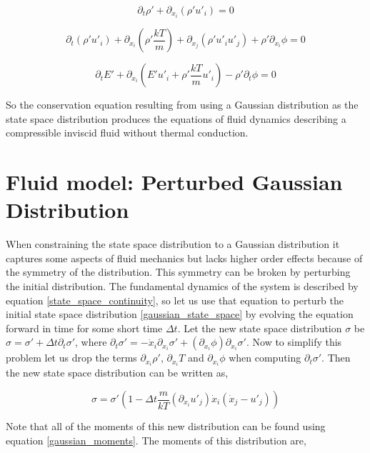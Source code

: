 \documentclass[%
 twocolumn,
 amsmath,amssymb,
 aps,
]{revtex4-1}
\begin{document}
\[
\partial_t \rho' + \partial_{x_i}\left(\rho'u'_i\right)=0
\]

\[
\partial_t \left(\rho' u'_i\right) + \partial_{x_i}\left(\rho'\frac{kT}{m}\right) + \partial_{x_j}\left(\rho'u'_iu'_j\right) + \rho'\partial_{x_i}\phi = 0
\]

\[
\partial_t E' + \partial_{x_i}\left(E'u'_i + \rho'\frac{kT}{m}u'_i\right)-\rho'\partial_t\phi = 0
\]

So the conservation equation resulting from using a Gaussian distribution as the state space distribution produces the equations of fluid dynamics describing a compressible inviscid fluid without thermal conduction.

\section{Fluid model: Perturbed Gaussian Distribution}
When constraining the state space distribution to a Gaussian distribution it captures some aspects of fluid mechanics but lacks higher order effects because of the symmetry of the distribution. This symmetry can be broken by perturbing the initial distribution. The fundamental dynamics of the system is described by equation \eqref{state_space_continuity}, so let us use that equation to perturb the initial state space distribution \eqref{gaussian_state_space} by evolving the equation forward in time for some short time $\Delta t$. Let the new state space distribution $\sigma$ be $\sigma=\sigma' + \Delta t\partial_t \sigma'$, where $\partial_t \sigma'=-\dot{x}_i\partial_{x_i}\sigma'+\left(\partial_{x_i}\phi\right)\partial_{\dot{x}_i}\sigma'$. Now to simplify this problem let us drop the terms $\partial_{x_i}\rho'$, $\partial_{x_i}T$ and $\partial_{x_i}\phi$ when computing $\partial_t \sigma'$. Then the new state space distribution can be written as,

\begin{equation}
\sigma = \sigma'\left(1-\Delta t\frac{m}{kT}\left(\partial_{x_i}u'_j\right)\dot{x}_i\left(\dot{x}_j-u'_j\right)\right)
\label{perturbed_gaussian_distribution}
\end{equation}

Note that all of the moments of this new distribution can be found using equation \eqref{gaussian_moments}. The moments of this distribution are,
\end{document}
